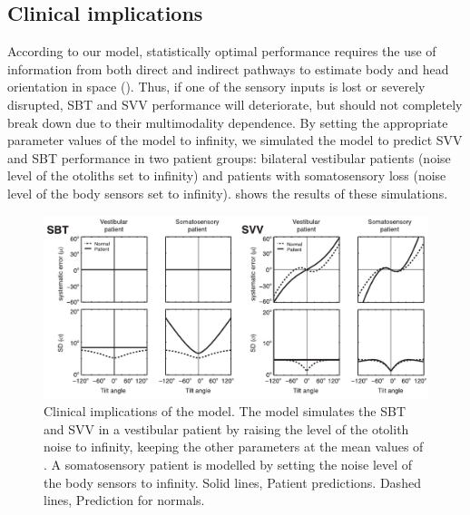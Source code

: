 \subsection{Clinical implications}

According to our model, statistically optimal performance requires the use of information from both direct and indirect pathways to estimate body and head orientation in space (). Thus, if one of the sensory inputs is lost or severely disrupted, SBT and SVV performance will deteriorate, but should not completely break down due to their multimodality dependence. By setting the appropriate parameter values of the model to infinity, we simulated the model to predict SVV and SBT performance in two patient groups: bilateral vestibular patients (noise level of the otoliths set to infinity) and patients with somatosensory loss (noise level of the body sensors set to infinity).  shows the results of these simulations.

\begin{figure}
    \includegraphics[width=1.0\textwidth]{src/paper1/figure7.pdf}

    \caption{Clinical implications of the model. The model simulates the SBT and SVV in a vestibular patient by raising the level of the otolith noise to infinity, keeping the other parameters at the mean values of . A somatosensory patient is modelled by setting the noise level of the body sensors to infinity. Solid lines, Patient predictions. Dashed lines, Prediction for normals.}
    \label{p1:fig7}
\end{figure}


